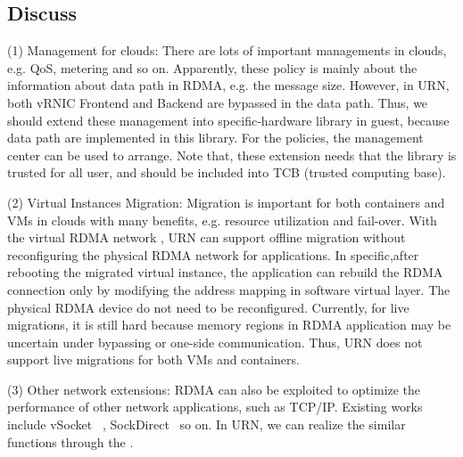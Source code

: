 \subsection{Discuss}
(1) Management for clouds: There are lots of important managements in clouds, e.g. QoS, metering and so on. Apparently, these policy is mainly about the information about data path in RDMA, e.g. the message size. However, in URN, both vRNIC Frontend and Backend are bypassed in the data path. Thus, we should extend these management into specific-hardware library in guest, because data path are implemented in this library. For the policies, the management center can be used to arrange. Note that, these extension needs that the library is trusted for all user, and should be included into TCB (trusted computing base).


(2) Virtual Instances Migration: Migration is important  for both containers and VMs in clouds with many benefits, e.g. resource utilization and fail-over. With the virtual RDMA network , URN can support offline migration without reconfiguring the physical RDMA network for applications. In specific,after rebooting the migrated virtual instance, the application can rebuild the RDMA connection  only by modifying the address mapping in software virtual layer. The physical RDMA device do not need to be reconfigured. Currently, for live migrations, it is still hard because memory regions in RDMA application may be uncertain under bypassing or one-side communication. Thus, URN does not support live migrations for both VMs and containers.

(3) Other network extensions: RDMA can also be exploited to optimize the performance of other network applications,  such as TCP/IP.  Existing works include vSocket ~\cite{wang2019vsocket}, SockDirect~\cite{li2019socksdirect} so on. In URN, we can realize the similar functions through the .  
